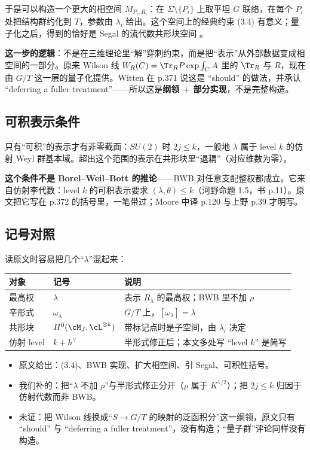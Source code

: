 于是可以构造一个更大的相空间 $M_{P_i,R_i}$：在 $\Sigma\setminus\{P_i\}$ 上取平坦 $G$ 联络，在每个 $P_i$ 处把结构群约化到 $T$，参数由 $\lambda_i$ 给出。这个空间上的经典约束 (3.4) 有意义；量子化之后，得到的恰好是 Segal 的流代数共形块空间 。

\begin{keypoint}
\textbf{这一步的逻辑}：不是在三维理论里“解”穿刺约束，而是把“表示”从外部数据变成相空间的一部分。原来 Wilson 线 $W_R(C)=\Tr_R P\exp\int_C A$ 里的 $\Tr_R$ 与 $R$，现在由 $G/T$ 这一层的量子化提供。Witten 在 p.371 说这是 “should” 的做法，并承认 “deferring a fuller treatment”——所以这是\textbf{纲领 + 部分实现}，不是完整构造。
\end{keypoint}

\subsection{可积表示条件}

只有“可积”的表示才有非零截面：$SU(2)$ 时 $2j\le k$，一般地 $\lambda$ 属于 level $k$ 的仿射 Weyl 群基本域。超出这个范围的表示在共形块里“退耦”（对应维数为零）。

\textbf{这个条件不是 Borel--Weil--Bott 的推论}——BWB 对任意支配整权都成立。它来自仿射李代数：level $k$ 的可积表示要求 $(\lambda,\theta)\le k$（河野命题 1.5，书 p.11）。原文把它写在 p.372 的括号里，一笔带过；Moore 中译 p.120 与上野 p.39 才明写。

\subsection{记号对照}

读原文时容易把几个“$\lambda$”混起来：
\begin{center}
\small
\begin{tabular}{@{}lll@{}}
\toprule
对象 & 记号 & 说明 \\
\midrule
最高权 & $\lambda$ & 表示 $R_\lambda$ 的最高权；BWB 里不加 $\rho$ \\
辛形式 & $\omega_\lambda$ & $G/T$ 上，$[\omega_\lambda]=\lambda$ \\
共形块 & $H^0(\cM_J,\cL^{\otimes k})$ & 带标记点时是子空间，由 $\lambda_i$ 决定 \\
仿射 level & $k+h^\vee$ & 半形式修正后；本文多处写 “level $k$” 是简写 \\
\bottomrule
\end{tabular}
\end{center}

\begin{boundary}
\begin{itemize}[leftmargin=1.4em]
\item 原文给出：(3.4)、BWB 实现、扩大相空间、引 Segal、可积性括号。
\item 我们补的：把“$\lambda$ 不加 $\rho$”与半形式修正分开（$\rho$ 属于 $K^{1/2}$）；把 $2j\le k$ 归因于仿射代数而非 BWB。
\item 未证：把 Wilson 线换成“$S\to G/T$ 的映射的泛函积分”这一纲领，原文只有 “should” 与 “deferring a fuller treatment”，没有构造；“量子群”评论同样没有构造。
\end{itemize}
\end{boundary}
